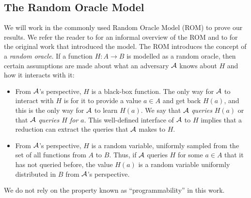 
\subsection{The Random Oracle Model}

We will work in the commonly used Random Oracle Model (ROM) to prove our results. We refer the reader to \cite[Chapter 6.5]{introduction-to-modern-cryptography} for an informal overview of the ROM and to \cite{rom} for the original work that introduced the model. The ROM introduces the concept of a \emph{random oracle}. If a function $H : A \to B$ is modelled as a random oracle, then certain assumptions are made about what an adversary $\mathcal{A}$ knows about $H$ and how it interacts with it:
\begin{itemize}
	\item From $\mathcal{A}$'s perspective, $H$ is a black-box function. The only way for $\mathcal{A}$ to interact with $H$ is for it to provide a value $a \in A$ and get back $H(a)$, and this is the only way for $\mathcal{A}$ to learn $H(a)$. We say that $\mathcal{A}$ \emph{queries} $H(a)$ or that $\mathcal{A}$ \emph{queries $H$ for $a$}. This well-defined interface of $\mathcal{A}$ to $H$ implies that a reduction can extract the queries that $\mathcal{A}$ makes to $H$.
	\item From $\mathcal{A}$'s perspective, $H$ is a random variable, uniformly sampled from the set of all functions from $A$ to $B$. Thus, if $\mathcal{A}$ queries $H$ for some $a \in A$ that it has not queried before, the value $H(a)$ is a random variable uniformly distributed in $B$ from $\mathcal{A}$'s perspective.
\end{itemize}
We do not rely on the property known as ``programmability'' in this work.
